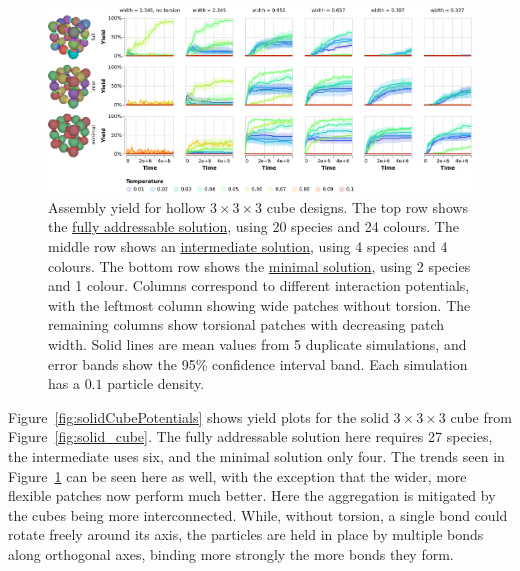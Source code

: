 \begin{figure}[h]
    \centering
    \includegraphics[width=\linewidth]{figures/patchysim/cubePotentials.eps}
    \caption{Assembly yield for hollow \(3 \times 3 \times 3\) cube designs. The top row shows the \href{https://akodiat.github.io/polycubes/?assemblyMode=stochastic&rule=00040109020c000089110200001491010218000001018e1c002001259e000000a5290200002ca901b200000001019a30963401010200863801010200ba00013d02400000bd450200b600c5010248ae4c01010200ce00e101d20000000101ca5000000101c254de000159d600a25c010102000000d9610200}{fully addressable solution}, using 20 species and 24 colours. The middle row shows an \href{https://akodiat.github.io/polycubes/?assemblyMode=stochastic&rule=90000800000600040090000d000000008b8d000011860000}{intermediate solution}, using 4 species and 4 colours. The bottom row shows the \href{https://akodiat.github.io/polycubes/?assemblyMode=stochastic&rule=070000070500868700000000}{minimal solution}, using 2 species and 1 colour. Columns correspond to different interaction potentials, with the leftmost column showing wide patches without torsion. The remaining columns show torsional patches with decreasing patch width. Solid lines are mean values from 5 duplicate simulations, and error bands show the 95\% confidence interval band. Each simulation has a \(0.1\) particle density.}
    \label{fig:cubePotentials}
\end{figure}

Figure~\ref{fig:solidCubePotentials} shows yield plots for the solid \(3 \times 3 \times 3\) cube from Figure~\ref{fig:solid_cube}. The fully addressable solution here requires 27 species, the intermediate uses six, and the minimal solution only four.  The trends seen in Figure~\ref{fig:cubePotentials} can be seen here as well, with the exception that the wider, more flexible patches now perform much better. Here the aggregation is mitigated by the cubes being more interconnected. While, without torsion, a single bond could rotate freely around its axis, the particles are held in place by multiple bonds along orthogonal axes, binding more strongly the more bonds they form.

